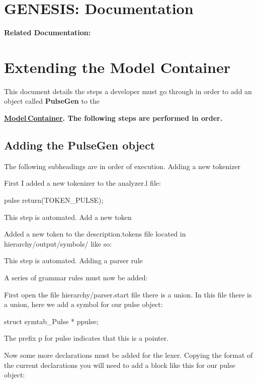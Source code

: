 \documentclass[12pt]{article}
\begin{document}
\section*{GENESIS: Documentation}

{\bf Related Documentation:}

\section*{Extending the Model Container}

This document details the steps a developer must go through in order to add an object called {\bf PulseGen} to the {\bf \href{../model-container/model-container.tex}{\bf Model\,Container}. The following steps are performed in order.

\subsection*{Adding the PulseGen object}

The following subheadings are in order of execution.
Adding a new tokenizer

First I added a new tokenizer to the analyzer.l file:

pulse           {       return(TOKEN_PULSE);    }

This step is automated.
Add a new token

Added a new token to the description.tokens file located in hierarchy/output/symbols/ like so:


This step is automated.
Adding a parser rule

A series of grammar rules must now be added:

First open the file hierarchy/parser.start file there is a union. In this file there is a union, here we add a symbol for our pulse object:

struct symtab_Pulse * ppulse;

The prefix p for pulse indicates that this is a pointer.

Now some more declarations must be added for the lexer. Copying the format of the current declarations you will need to add a block like this for our pulse object:


}
\end{document}
